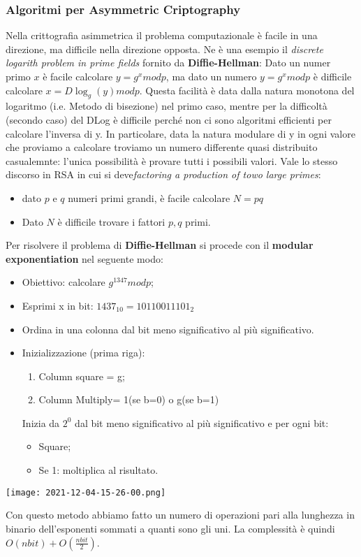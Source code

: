 \documentclass{article}
\theoremstyle{remark}
\begin{document}
\subsubsection{Algoritmi per Asymmetric Criptography}
Nella crittografia asimmetrica il problema computazionale è facile in una direzione, ma difficile nella direzione opposta. Ne è una esempio il \emph{discrete logarith problem in prime fields} fornito da \textbf{Diffie-Hellman}: Dato un numer primo \(x\) è facile calcolare \(y=g^x mod p\), ma dato un numero \(y=g^x mod p\) è difficile calcolare \(x=D\log_{g}(y) mod p\). Questa facilità è data dalla natura monotona del logaritmo (i.e. Metodo di bisezione) nel primo caso, mentre per la difficoltà (secondo caso) del DLog è difficile perché non ci sono algoritmi efficienti per calcolare l'inversa di y. In particolare, data la natura modulare di y in ogni valore che proviamo a calcolare troviamo un numero differente quasi distribuito casualemnte: l'unica possibilità è provare tutti i possibili valori.\newline 
Vale lo stesso discorso in RSA in cui si deve\emph{factoring a production of towo large primes}:\begin{itemize}
	\item dato \(p\) e \(q\) numeri primi grandi, è facile calcolare \(N=pq\)
	\item Dato \(N\) è difficile trovare i fattori \(p,q\) primi.
\end{itemize}
Per risolvere il problema di \textbf{Diffie-Hellman} si procede con il \textbf{modular exponentiation} nel seguente modo:\begin{itemize}
	\item Obiettivo: calcolare \(g^{1347}mod p\);
	\item Esprimi x in bit: \(1437_{10}=10110011101_2\)
	\item Ordina in una colonna dal bit meno significativo al più significativo.
	\item Inizializzazione (prima riga):\begin{enumerate}
		\item Column square = g;
		\item Column Multiply= 1(se b=0) o g(se b=1)
	\end{enumerate}
	Inizia da \(2^0\) dal bit meno significativo al più significativo e per ogni bit:\begin{itemize}
		\item Square;
		\item Se 1: moltiplica al risultato.
	\end{itemize}
\end{itemize}
\begin{center}
	\texttt{[image: 2021-12-04-15-26-00.png]}
\end{center}
Con questo metodo abbiamo fatto un numero di operazioni pari alla lunghezza in binario dell'esponenti sommati a quanti sono gli uni. La complessità è quindi \(O(nbit)+O(\frac{nbit}{2})\).
\end{document}

